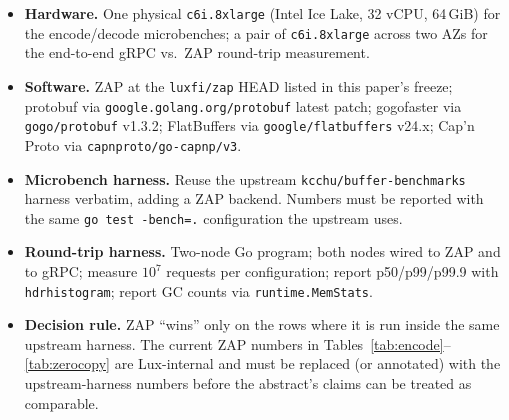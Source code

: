 \begin{itemize}
  \item \textbf{Hardware.} One physical \texttt{c6i.8xlarge} (Intel
        Ice Lake, 32 vCPU, 64\,GiB) for the encode/decode microbenches;
        a pair of \texttt{c6i.8xlarge} across two AZs for the
        end-to-end gRPC vs.\ ZAP round-trip measurement.
  \item \textbf{Software.} ZAP at the \texttt{luxfi/zap} HEAD listed in
        this paper's freeze; protobuf via \texttt{google.golang.org/protobuf}
        latest patch; gogofaster via \texttt{gogo/protobuf} v1.3.2;
        FlatBuffers via \texttt{google/flatbuffers} v24.x; Cap'n Proto
        via \texttt{capnproto/go-capnp/v3}.
  \item \textbf{Microbench harness.} Reuse the upstream
        \texttt{kcchu/buffer-benchmarks} harness verbatim, adding a
        ZAP backend. Numbers must be reported with the same
        \texttt{go test -bench=.} configuration the upstream uses.
  \item \textbf{Round-trip harness.} Two-node Go program; both nodes
        wired to ZAP and to gRPC; measure $10^7$ requests per
        configuration; report p50/p99/p99.9 with
        \texttt{hdrhistogram}; report GC counts via
        \texttt{runtime.MemStats}.
  \item \textbf{Decision rule.} ZAP ``wins'' only on the rows where it
        is run inside the same upstream harness. The current ZAP
        numbers in Tables~\ref{tab:encode}--\ref{tab:zerocopy} are
        Lux-internal and must be replaced (or annotated) with the
        upstream-harness numbers before the abstract's claims can be
        treated as comparable.
\end{itemize}

